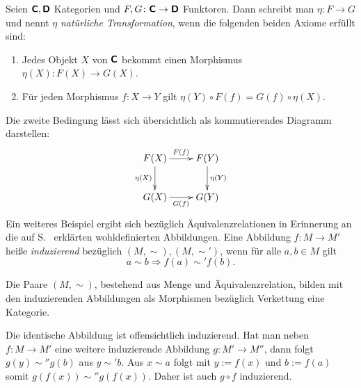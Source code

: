 \begin{Definition}\newlinefirst
Seien $\textsf{\textbf{C}}, \textsf{\textbf{D}}$ Kategorien und
$F,G\colon \textsf{\textbf{C}}\to \textsf{\textbf{D}}$ Funktoren.
Dann schreibt man $\eta\colon F\to G$ und nennt $\eta$ \emph{natürliche
Transformation}, wenn die folgenden beiden Axiome erfüllt sind:
\begin{enumerate}
\item Jedes Objekt $X$ von $\textsf{\textbf{C}}$ bekommt einen Morphismus\\
$\eta(X)\colon F(X)\to G(X)$.
\item Für jeden Morphismus $f\colon X\to Y$ gilt
$\eta(Y)\circ F(f)=G(f)\circ\eta(X)$.
\end{enumerate}
\end{Definition}
Die zweite Bedingung lässt sich übersichtlich als kommutierendes Diagramm
darstellen:
\[\xymatrix{
F(X) \ar[r]^{F(f)} \ar[d]_{\eta(X)} & F(Y) \ar[d]^{\eta(Y)} \\
G(X) \ar[r]_{G(f)} & G(Y)}\]
Ein weiteres Beispiel ergibt sich bezüglich Äquivalenzrelationen
in Erinnerung an die auf S.~\pageref{wohldefiniert} erklärten
wohldefinierten Abbildungen. Eine Abbildung $f\colon M\to M'$ heiße
\emph{induzierend} bezüglich $(M,\sim),(M,\sim')$, wenn für alle
$a,b\in M$ gilt%
\[a\sim b \Rightarrow f(a)\sim' f(b).\]

\begin{Satz}
Die Paare $(M,\sim)$, bestehend aus Menge und Äquivalenzrelation,
bilden mit den induzierenden Abbildungen
als Morphismen bezüglich Verkettung eine Kategorie.
\end{Satz}
Die identische Abbildung ist offensichtlich induzierend. Hat man
neben $f\colon M\to M'$ eine weitere induzierende Abbildung $g\colon M'\to M''$, dann
folgt $g(y)\sim'' g(b)$ aus $y\sim' b$. Aus $x\sim a$ folgt
mit $y:=f(x)$ und $b:=f(a)$ somit $g(f(x))\sim'' g(f(x))$.
Daher ist auch $g\circ f$ induzierend.\;\qedsymbol

